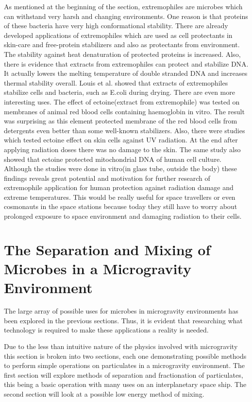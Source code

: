 \documentclass[12pt]{article}
\begin{document}
As mentioned at the beginning of the section, extremophiles are microbes which can withstand
very harsh and changing environments. One reason is that proteins of these bacteria have very
high conformational stability. There are already developed applications of extremophiles which
are used as cell protectants in skin-care and free-protein stabilizers and also as protectants from
environment. The stability against heat denaturation of protected proteins is increased. Also,
there is evidence that extracts from extremophiles can protect and stabilize DNA. It actually
lowers the melting temperature of double stranded DNA and increases thermal stability overall.
Louis et al. showed that extracts of extremophiles stabilize cells and bacteria, such as E.coli
during drying. There are even more interesting uses. The effect of ectoine(extract from
extremophile) was tested on membranes of animal red blood cells containing haemoglobin in
vitro. The result was surprising as this element protected membrane of the red blood cells from detergents even better than some well-known stabilizers. Also, there were studies which tested
ectoine effect on skin cells against UV radiation. At the end after applying radiation doses there
was no damage to the skin. The same study also showed that ectoine protected mitochondrial
DNA of human cell culture. Although the studies were done in vitro(in glass tube, outside the
body) these findings reveals great potential and motivation for further research of extremophile
application for human protection against radiation damage and extreme temperatures. This
would be really useful for space travellers or even cosmonauts in the space stations because
today they still have to worry about prolonged exposure to space environment and damaging
radiation to their cells.



\section{The Separation and Mixing of Microbes in a Microgravity Environment}
The large array of possible uses for microbes in microgravity environments has been explored in the previous sections. Thus, it is evident that researching what technology is required to make these applications a reality is needed. 


Due to the less than intuitive nature of the physics involved with microgravity this section is broken into two sections, each one demonstrating possible methods to perform simple operations on particulates in a microgravity environment. The first section will explore methods of separation and fractionation of particulates, this being a basic operation with many uses on an interplanetary space ship. The second section will look at a possible low energy method of mixing.
\end{document}
